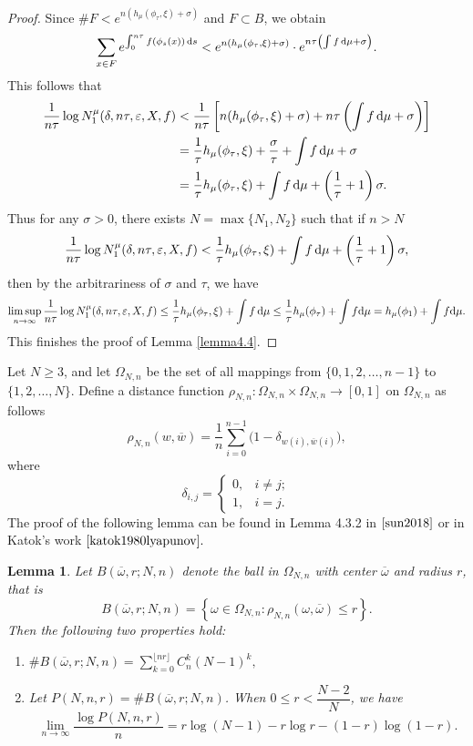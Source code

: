 \documentclass[10pt]{article}
\newtheorem*{Theorem A}{Theorem A}
\newtheorem{Lemma}[Theorem]{Lemma}
\begin{document}
\begin{proof}
\noindent
Since \( \#F < e^{n(h_\mu(\phi_\tau, \xi) + \sigma)} \) and $F\subset B$, we obtain
\[
 \sum\limits_{x \in F} e^{\int_{0}^{n\tau} f(\phi_s(x)) \, {\rm d}s} < e^{n(h_\mu(\phi_\tau, \xi) + \sigma)} \cdot e^{n\tau \left( \int f \, {\rm d}\mu + \sigma \right)}.
\]
This follows that
\begin{align*}
\frac{1}{n\tau} \log N_1^\mu(\delta, n\tau, \varepsilon, X, f)
&< \frac{1}{n\tau} \left[ n(h_\mu(\phi_\tau, \xi) + \sigma) + n\tau \left( \int f \, {\rm d}\mu + \sigma \right) \right] \\
&= \frac{1}{\tau} h_\mu(\phi_\tau, \xi) + \frac{\sigma}{\tau} + \int f \, {\rm d}\mu + \sigma \\
&= \frac{1}{\tau} h_\mu(\phi_\tau, \xi) + \int f \, {\rm d}\mu + \left( \frac{1}{\tau} + 1 \right) \sigma.
\end{align*}
Thus for any \(\sigma > 0 \), there exists \(N =\max\{N_1, N_2\}\) such that if \( n > N \)
\[
\frac{1}{n\tau} \log N_1^\mu(\delta, n\tau, \varepsilon, X, f) < \frac{1}{\tau} h_\mu(\phi_\tau, \xi) + \int f \, {\rm d}\mu + \left( \frac{1}{\tau} + 1 \right) \sigma,
\]
then by the arbitrariness of $\sigma$ and $\tau$, we have
\[
\limsup\limits_{n \to \infty} \frac{1}{n\tau} \log N_1^\mu(\delta, n\tau, \varepsilon, X, f) \leq \frac{1}{\tau} h_\mu(\phi_\tau, \xi) + \int f \, {\rm d}\mu\leq\frac{1}{\tau}h_\mu(\phi_\tau)+\int f{\rm d}\mu=h_\mu(\phi_1)+\int f{\rm d}\mu.
\]
This finishes the proof of Lemma \ref{lemma4.4}.
\end{proof}


Let \(N \geq 3\), and let \(\Omega_{N,n}\) be the set of all mappings from \(\{0, 1, 2, \ldots, n-1\}\) to \(\{1, 2, \ldots, N\}\). Define a distance function \(\rho_{N,n}: \Omega_{N,n} \times \Omega_{N,n} \to [0, 1]\) on \(\Omega_{N,n}\) as follows
\[
\rho_{N,n}(w, \overline{w}) = \frac{1}{n} \sum_{i=0}^{n-1} \bigl( 1 - \delta_{w(i), \overline{w}(i)} \bigr),
\]
where
\[
\delta_{i,j} =
\begin{cases}
0, & i \neq j; \\
1, & i = j.
\end{cases}
\]
The proof of the following lemma can be found in Lemma 4.3.2 in  \(\cite{sun2018}\)   or in Katok's work \(\cite{katok1980lyapunov} .\)

\begin{Lemma}\label{lemma4.5}
 Let \( B(\overline{\omega}, r; N, n) \) denote the ball in \( \Omega_{N,n} \) with center \( \overline{\omega} \) and radius \( r \), that is
\[
B(\overline{\omega}, r; N, n) = \left\{ \omega \in \Omega_{N,n} : \rho_{N,n}(\omega, \overline{\omega}) \leq r \right\}.
\]
Then the following two properties hold:
\begin{enumerate}
\item[1.]
\(
\# B(\overline{\omega}, r; N, n) = \sum_{k=0}^{\lfloor nr \rfloor} C_n^k (N-1)^k,
\)

\item[2.] Let \( P(N, n, r) = \# B(\overline{\omega}, r; N, n) \). When \( 0 \leq r < \dfrac{N-2}{N} \), we have
\[
\lim_{n \to \infty} \frac{\log P(N, n, r)}{n} = r \log(N-1) - r \log r - (1-r) \log(1-r).
\]
\end{enumerate}
\end{Lemma}
\end{document}
